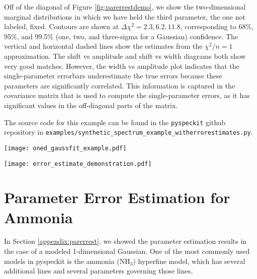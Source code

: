 \documentclass[twocolumn]{aastex62}
\newcommand{\pyspeckit}{\texttt{pyspeckit}\xspace}
\newcommand{\ammonia}{\ensuremath{\mathrm{NH}_3}\xspace}
\begin{document}
Off of the diagonal of Figure \ref{fig:parerrestdemo}, we show the
two-dimensional marginal distributions in which we have held the third
parameter, the one not labeled, fixed.  Contours are shown at
$\Delta\chi^2=2.3,6.2,11.8$, corresponding to 68\%, 95\%, and 99.5\% (one, two,
and three-sigma for a Gaussian) confidence.
The vertical and horizontal dashed lines show the estimates from the $\chi^2/n=1$
approximation.
The shift vs amplitude and shift vs width diagrams both show very good matches.
However, the width vs amplitude plot indicates that the single-parameter
errorbars underestimate the true errors because these parameters are
significantly correlated.  This information is captured in the covariance
matrix that is used to compute the single-parameter errors, as it has
significant values in the off-diagonal parts of the matrix.

The source code for this example can be found in the \pyspeckit github
repository in \texttt{examples/synthetic\_spectrum\_example\_witherrorestimates.py}.

\begin{figure*}[!htp]
\texttt{[image: oned\_gaussfit\_example.pdf]}
\caption{One-dimensional Gaussian profile fit to a synthetic spectrum.
The parameter values and errors are shown in the upper right.  The number of
significant figures displayed in both the value and the error is automatically
set to one digit more than the last significant digit in the error.}
\label{fig:synthspecdemo}
\end{figure*}


\begin{figure*}[!htp]
\texttt{[image: error\_estimate\_demonstration.pdf]}
\caption{Error estimate figure.
In all panels, the vertical
dashed lines show the estimated one-sigma errors from the optimizer, while the
horizontal dashed lines show the value $\Delta\chi^2=1$, which corresponds to
the 68\% confidence interval for that parameter.
In the off-diagonal panels, contours are shown at $\Delta\chi^2=2.3,6.2,11.8$,
corresponding to 68\%, 95\%, and 99.5\% (one, two, and three-sigma for a
Gaussian) confidence.
See Appendix \ref{appendix:parerrest} for details and interpretation.}
\label{fig:parerrestdemo}
\end{figure*}


\section{Parameter Error Estimation for Ammonia}
\label{appendix:parerrestammonia}
In Section \ref{appendix:parerrest}, we showed the parameter estimation results
in the case of a modeled 1-dimensional Gaussian.  One of the most commonly used
models in pyspeckit is the ammonia (\ammonia) hyperfine model, which has several
additional lines and several parameters governing those lines.
\end{document}
